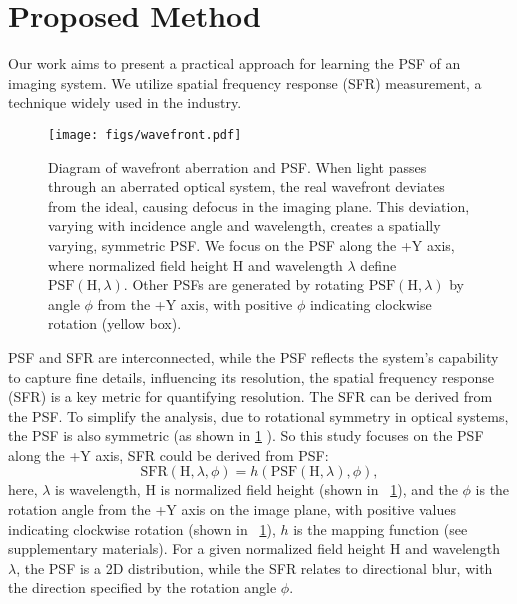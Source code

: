 \section{Proposed Method}


Our work aims to present a practical approach for learning the PSF of an imaging system. We utilize spatial frequency response (SFR) measurement, a technique widely used in the industry.
\begin{figure}[b]
\centering
\vspace{-0.2cm} 
    \texttt{[image: figs/wavefront.pdf]}
    \setlength{\abovecaptionskip}{-0.2cm} 
    \caption{Diagram of wavefront aberration and PSF. When light passes through an aberrated optical system, the real wavefront deviates from the ideal, causing defocus in the imaging plane. This deviation, varying with incidence angle and wavelength, creates a spatially varying, symmetric PSF. We focus on the PSF along the +Y axis, where normalized field height $\mathrm{H}$ and wavelength $\lambda$ define $\mbox{PSF}(\mathrm{H}, \lambda)$. Other PSFs are generated by rotating $\mbox{PSF}(\mathrm{H}, \lambda)$ by angle $\phi$ from the +Y axis, with positive $\phi$ indicating clockwise rotation (yellow box).   
 }
    \label{fig:wa_h}
    \vspace{-0.1cm} 
    
\end{figure}


PSF and SFR are interconnected, while the PSF reflects the system's capability to capture fine details, influencing its resolution, the spatial frequency response (SFR) is a key metric for quantifying resolution. The SFR can be derived from the PSF. To simplify the analysis, due to rotational symmetry in optical systems, the PSF is also symmetric (as shown in \cref{fig:wa_h} ). So this study focuses on the PSF along the +Y axis, SFR could be derived from PSF:
\begin{equation}\label{eq:sfr}
\mbox{SFR}(\mathrm{H},\lambda,\phi) = h(\mbox{PSF}(\mathrm{H},\lambda),\phi),
\end{equation}
here, $\lambda$ is wavelength, $\mathrm{H}$ is normalized field height  (shown in ~\cref{fig:wa_h}), and the $\phi$ is the rotation angle from the +Y axis on the image plane, with positive values indicating clockwise rotation (shown in ~\cref{fig:wa_h}), $h$ is the mapping function (see supplementary materials). For a given normalized field height $\mathrm{H}$ and wavelength $\lambda$, the PSF is a 2D distribution, while the SFR relates to directional blur, with the direction specified by the rotation angle $\phi$.

